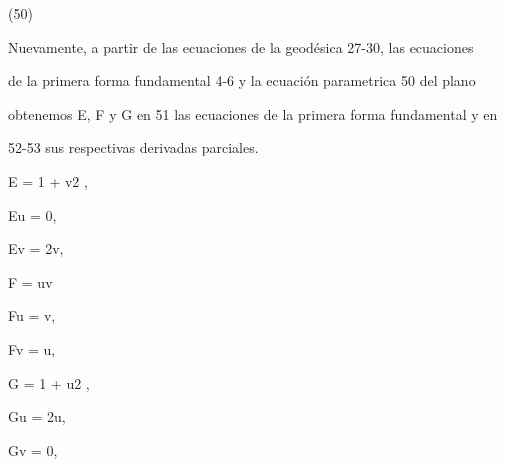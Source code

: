 \documentclass[a4paper,portrait,12pt]{article}
\begin{document}
(50)





\begin{flushleft}
Nuevamente, a partir de las ecuaciones de la geodésica 27-30, las ecuaciones
\end{flushleft}


\begin{flushleft}
de la primera forma fundamental 4-6 y la ecuación parametrica 50 del plano
\end{flushleft}


\begin{flushleft}
obtenemos E, F y G en 51 las ecuaciones de la primera forma fundamental y en
\end{flushleft}


\begin{flushleft}
52-53 sus respectivas derivadas parciales.
\end{flushleft}


\begin{flushleft}
E = 1 + v2 ,
\end{flushleft}


\begin{flushleft}
Eu = 0,
\end{flushleft}


\begin{flushleft}
Ev = 2v,
\end{flushleft}





\begin{flushleft}
F = uv
\end{flushleft}


\begin{flushleft}
Fu = v,
\end{flushleft}


\begin{flushleft}
Fv = u,
\end{flushleft}





\begin{flushleft}
G = 1 + u2 ,
\end{flushleft}


\begin{flushleft}
Gu = 2u,
\end{flushleft}


\begin{flushleft}
Gv = 0,
\end{flushleft}
\end{document}
